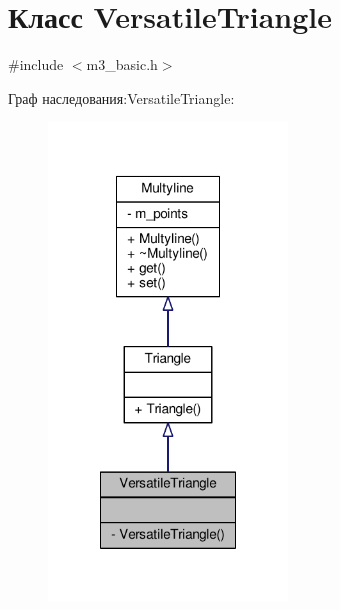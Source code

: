 \hypertarget{class_versatile_triangle}{\section{Класс Versatile\-Triangle}
\label{class_versatile_triangle}
}


{\ttfamily \#include $<$m3\-\_\-basic.\-h$>$}



Граф наследования\-:Versatile\-Triangle\-:
\nopagebreak
\begin{figure}[H]
\begin{center}
\leavevmode
\includegraphics[width=180pt]{class_versatile_triangle__inherit__graph}
\end{center}
\end{figure}


